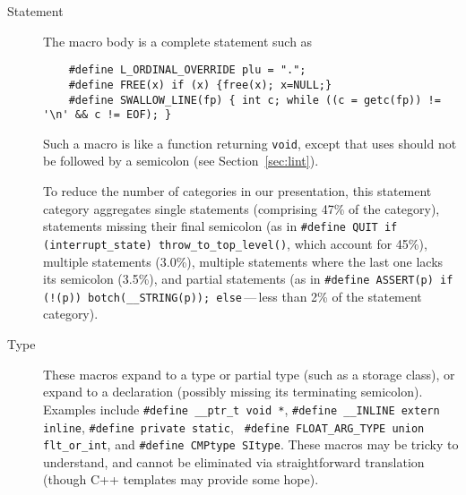 \documentclass[10pt]{article}
\begin{document}
\begin{description}
\item[Statement]\label{item:statement-category}
  The macro body is a complete statement such as
\begin{verbatim}
    #define L_ORDINAL_OVERRIDE plu = ".";
    #define FREE(x) if (x) {free(x); x=NULL;}
    #define SWALLOW_LINE(fp) { int c; while ((c = getc(fp)) != '\n' && c != EOF); }
\end{verbatim}
  Such a macro is like a function returning {\tt void}, except that uses
  should not be followed by a semicolon (see Section~\ref{sec:lint}).
    
  To reduce the number of categories in our presentation, this statement
  category aggregates single statements (comprising 47\% of the category),
  statements missing their final semicolon (as in {\tt \#define QUIT if
  (\verb|interrupt_state|) \verb|throw_to_top_level|()}, which account
  for 45\%), multiple statements (3.0\%), multiple statements where the
  last one lacks its semicolon (3.5\%), and partial statements
  (as in {\tt \#define ASSERT(p) if (!(p)) botch(\verb|__STRING|(p));
  else}\,---\,less than 2\% of the statement category).

\item[Type] 
  These macros expand to a type or partial type (such as a storage class),
  or expand to a declaration (possibly missing its terminating semicolon).
  Examples include {\tt \#define \verb|__ptr_t| void~*}, {\tt \#define
  \verb|__INLINE| extern inline}, {\tt \#define private static}, {\tt
\#define \verb|FLOAT_ARG_TYPE| union \verb|flt_or_int|}, and {\tt \#define
CMPtype SItype}.  These macros may be tricky to understand, and cannot be
eliminated via straightforward translation (though C++ templates may
provide some hope).




\end{description}
\end{document}
